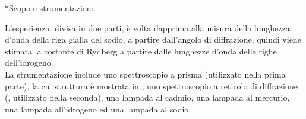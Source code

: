 \begin{section}*{Scopo e strumentazione}

L'esperienza, divisa in due parti, è volta dapprima alla misura della lunghezza d'onda della riga gialla del sodio, a partire dall'angolo di diffrazione, quindi viene stimata la costante di Rydberg a partire dalle lunghezze d'onda delle righe dell'idrogeno.\\ La strumentazione include uno spettroscopio a prisma (utilizzato nella prima parte), la cui struttura è mostrata in , uno spettroscopio a reticolo di diffrazione (, utilizzato nella seconda), una lampada al cadmio, una lampada al mercurio, una lampada all'idrogeno ed una lampada al sodio.


\end{section}

